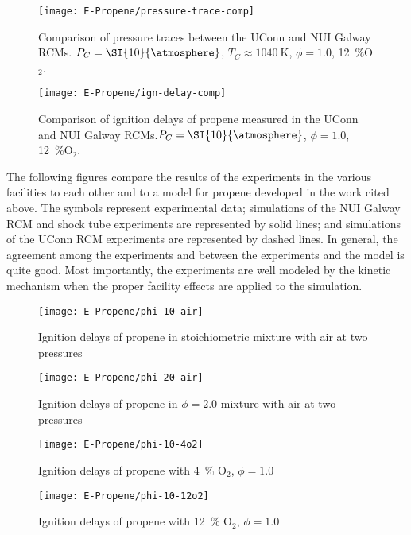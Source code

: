 \documentclass[../main.tex]{subfiles}
\begin{document}
\begin{figure}
    \begin{floatrow}
        \ffigbox
            {\texttt{[image: E-Propene/pressure-trace-comp]}}
            {\caption{Comparison of pressure traces between the UConn and
            NUI Galway RCMs. $P_C=\SI{10}{\atmosphere}$, $T_C\approx\SI{1040}{\kelvin}$,
            $\phi=1.0$, \SI{12}{\percent}O$_2$.}
            \label{fig:pressure-trace-comp}}
        \ffigbox
            {\texttt{[image: E-Propene/ign-delay-comp]}}
            {\caption{Comparison of ignition delays of propene measured
            in the UConn and NUI Galway RCMs.$P_C=\SI{10}{\atmosphere}$,
            $\phi=1.0$, \SI{12}{\percent}O$_2$.}
            \label{fig:ign-delay-comp}}
    \end{floatrow}
\end{figure}

The following figures compare the results of the experiments in the
various facilities to each other and to a model for propene developed
in the work cited above. The symbols represent experimental data; simulations
of the NUI Galway RCM and shock tube experiments are represented by solid lines;
and simulations of the UConn RCM experiments are represented by dashed lines.
In general, the agreement among the experiments and between the experiments
and the model is quite good. Most importantly, the experiments are well
modeled by the kinetic mechanism when the proper facility effects are
applied to the simulation.

\begin{figure}
    \begin{floatrow}
        \ffigbox
            {\texttt{[image: E-Propene/phi-10-air]}}
            {\caption{Ignition delays of propene in stoichiometric
            mixture with air at two pressures}
            \label{fig:phi-10-air}}
        \ffigbox
            {\texttt{[image: E-Propene/phi-20-air]}}
            {\caption{Ignition delays of propene in $\phi=2.0$
            mixture with air at two pressures}
            \label{fig:phi-20-air}}
    \end{floatrow}
\end{figure}

\begin{figure}
    \begin{floatrow}
        \ffigbox
            {\texttt{[image: E-Propene/phi-10-4o2]}}
            {\caption{Ignition delays of propene with \SI{4}{\percent}
            O$_2$, $\phi=1.0$}
            \label{fig:phi-10-4o2}}
        \ffigbox
            {\texttt{[image: E-Propene/phi-10-12o2]}}
            {\caption{Ignition delays of propene with \SI{12}{\percent}
            O$_2$, $\phi=1.0$}
            \label{fig:phi-10-12o2}}
    \end{floatrow}
\end{figure}
\end{document}
